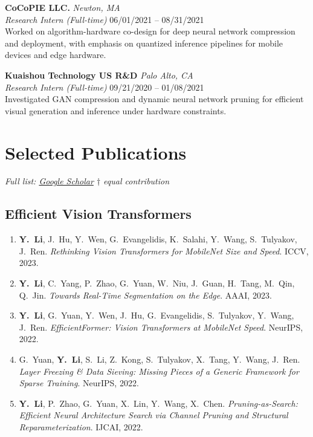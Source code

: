\documentclass[11pt,letterpaper]{article}
\newcommand{\cventry}[4]{%
    \noindent\textbf{#1} \hfill \textit{#2} \\
    \textit{#3} \hfill #4 \\[4pt]
}
\newcommand{\pub}[4]{%
    \item #1. \textit{#2}. #3, #4.
}
\begin{document}
\cventry{CoCoPIE LLC.}{Newton, MA}{Research Intern (Full-time)}{06/01/2021 -- 08/31/2021}
Worked on algorithm-hardware co-design for deep neural network compression and deployment, with emphasis on quantized inference pipelines for mobile devices and edge hardware.

\cventry{Kuaishou Technology US R\&D}{Palo Alto, CA}{Research Intern (Full-time)}{09/21/2020 -- 01/08/2021}
Investigated GAN compression and dynamic neural network pruning for efficient visual generation and inference under hardware constraints.


\section{Selected Publications}
\small
\textit{Full list: \href{https://scholar.google.com/citations?user=XUj8koUAAAAJ\&hl=en}{Google Scholar}
\hfill $\dagger$ equal contribution}

\vspace{4pt}
\subsection*{Efficient Vision Transformers}

\begin{enumerate}

\pub{\textbf{Y.\ Li}, J.\ Hu, Y.\ Wen, G.\ Evangelidis, K.\ Salahi, Y.\ Wang, S.\ Tulyakov, J.\ Ren}
    {Rethinking Vision Transformers for MobileNet Size and Speed}
    {ICCV}{2023}

\pub{\textbf{Y.\ Li}, C.\ Yang, P.\ Zhao, G.\ Yuan, W.\ Niu, J.\ Guan, H.\ Tang, M.\ Qin, Q.\ Jin}
    {Towards Real-Time Segmentation on the Edge}
    {AAAI}{2023}

\pub{\textbf{Y.\ Li}, G.\ Yuan, Y.\ Wen, J.\ Hu, G.\ Evangelidis, S.\ Tulyakov, Y.\ Wang, J.\ Ren}
    {EfficientFormer: Vision Transformers at MobileNet Speed}
    {NeurIPS}{2022}

\pub{G.\ Yuan, \textbf{Y.\ Li}, S.\ Li, Z.\ Kong, S.\ Tulyakov, X.\ Tang, Y.\ Wang, J.\ Ren}
    {Layer Freezing \& Data Sieving: Missing Pieces of a Generic Framework for Sparse Training}
    {NeurIPS}{2022}

\pub{\textbf{Y.\ Li}, P.\ Zhao, G.\ Yuan, X.\ Lin, Y.\ Wang, X.\ Chen}
    {Pruning-as-Search: Efficient Neural Architecture Search via Channel Pruning and Structural Reparameterization}
    {IJCAI}{2022}

\end{enumerate}
\end{document}
